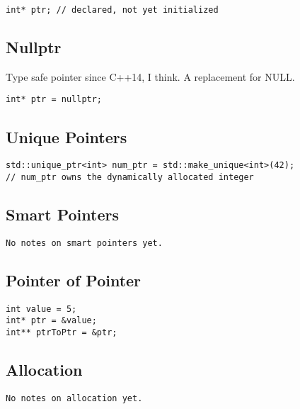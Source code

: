 \begin{verbatim}
int* ptr; // declared, not yet initialized
\end{verbatim}

\subsection{Nullptr}

Type safe pointer since C++14, I think. A replacement for NULL.

\begin{verbatim}
int* ptr = nullptr;
\end{verbatim}

\subsection{Unique Pointers}

\begin{verbatim}
std::unique_ptr<int> num_ptr = std::make_unique<int>(42);
// num_ptr owns the dynamically allocated integer
\end{verbatim}

\subsection{Smart Pointers}
\begin{verbatim}
No notes on smart pointers yet.
\end{verbatim}

\subsection{Pointer of Pointer}

\begin{verbatim}
int value = 5;
int* ptr = &value;
int** ptrToPtr = &ptr;
\end{verbatim}

\subsection{Allocation}

\begin{verbatim}
No notes on allocation yet.
\end{verbatim}

